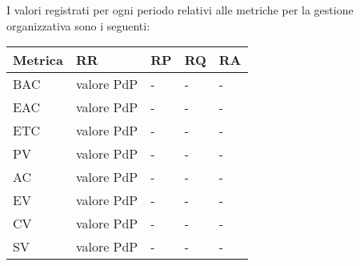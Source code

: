 I valori registrati per ogni periodo relativi alle metriche per la gestione organizzativa sono i seguenti:

\begin{longtable}{
		>{\centering}p{}
		>{\centering}p{}
		>{\centering}p{}
		>{\centering}p{}
		>{}p{} }

	\textbf{\color{white}Metrica} &
	\textbf{\color{white}RR} &
	\textbf{\color{white}RP} &
	\textbf{\color{white}RQ} &
	\textbf{\color{white}RA}
	\tabularnewline
	\endhead

	BAC & valore PdP & - & - & - \\
	EAC & valore PdP & - & - & - \\
	ETC & valore PdP & - & - & - \\
	PV & valore PdP & - & - & - \\
	AC & valore PdP & - & - & - \\
	EV & valore PdP & - & - & - \\
	CV & valore PdP & - & - & - \\
	SV & valore PdP & - & - & - \\
\end{longtable}